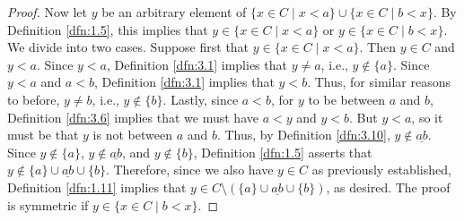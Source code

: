 \documentclass[../main.tex]{subfiles}
\begin{document}
\begin{lemma}
\begin{proof}
        Now let $y$ be an arbitrary element of $\{x\in C\mid x<a\}\cup\{x\in C\mid b<x\}$. By Definition \ref{dfn:1.5}, this implies that $y\in\{x\in C\mid x<a\}$ or $y\in\{x\in C\mid b<x\}$. We divide into two cases. Suppose first that $y\in\{x\in C\mid x<a\}$. Then $y\in C$ and $y<a$. Since $y<a$, Definition \ref{dfn:3.1} implies that $y\neq a$, i.e., $y\notin\{a\}$. Since $y<a$ and $a<b$, Definition \ref{dfn:3.1} implies that $y<b$. Thus, for similar reasons to before, $y\neq b$, i.e., $y\notin\{b\}$. Lastly, since $a<b$, for $y$ to be between $a$ and $b$, Definition \ref{dfn:3.6} implies that we must have $a<y$ and $y<b$. But $y<a$, so it must be that $y$ is not between $a$ and $b$. Thus, by Definition \ref{dfn:3.10}, $y\notin\underline{ab}$. Since $y\notin\{a\}$, $y\notin\underline{ab}$, and $y\notin\{b\}$, Definition \ref{dfn:1.5} asserts that $y\notin\{a\}\cup\underline{ab}\cup\{b\}$. Therefore, since we also have $y\in C$ as previously established, Definition \ref{dfn:1.11} implies that $y\in C\setminus(\{a\}\cup\underline{ab}\cup\{b\})$, as desired. The proof is symmetric if $y\in\{x\in C\mid b<x\}$.
    \end{proof}
\end{lemma}
\end{document}
